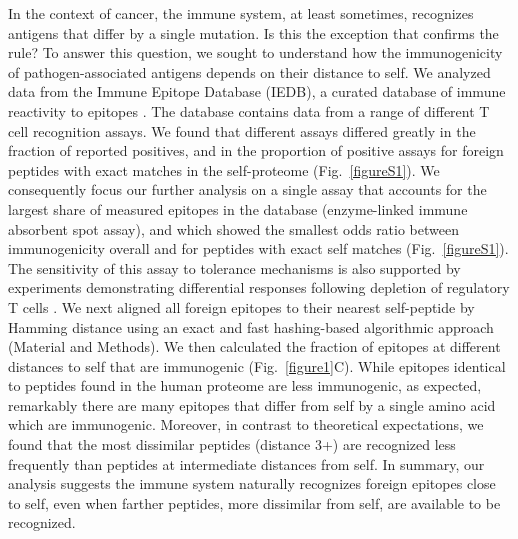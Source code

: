 \documentclass[superscriptaddress,twocolumn,pre]{revtex4}
\newcommand{\<}{\langle}
\renewcommand{\>}{\rangle}
\begin{document}
In the context of cancer, the immune system, at least sometimes, recognizes antigens that differ by a single mutation. Is this the exception that confirms the rule? To answer this question, we sought to understand how the immunogenicity of pathogen-associated antigens depends on their distance to self. We analyzed data from the Immune Epitope Database (IEDB), a curated database of immune reactivity to epitopes \cite{Vita2019}. The database contains data from a range of different T cell recognition assays. We found that different assays differed greatly in the fraction of reported positives, and in the proportion of positive assays for foreign peptides with exact matches in the self-proteome (Fig.~\ref{figureS1}). We consequently focus our further analysis on a single assay that accounts for the largest share of measured epitopes in the database (enzyme-linked immune absorbent spot assay), and which showed the smallest odds ratio between immunogenicity overall and for peptides with exact self matches (Fig.~\ref{figureS1}). The sensitivity of this assay to tolerance mechanisms is also supported by experiments demonstrating differential responses following depletion of regulatory T cells \cite{Bonertz2009}. We next aligned all foreign epitopes to their nearest self-peptide by Hamming distance using an exact and fast hashing-based algorithmic approach (Material and Methods). We then calculated the fraction of epitopes at different distances to self that are immunogenic (Fig.~\ref{figure1}C). While epitopes identical to peptides found in the human proteome are less immunogenic, as expected, remarkably there are many epitopes that differ from self by a single amino acid which are immunogenic. Moreover, in contrast to theoretical expectations, we found that the most dissimilar peptides (distance 3+) are recognized less frequently than peptides at intermediate distances from self. In summary, our analysis suggests the immune system naturally recognizes foreign epitopes close to self, even when farther peptides, more dissimilar from self, are available to be recognized.
\end{document}
